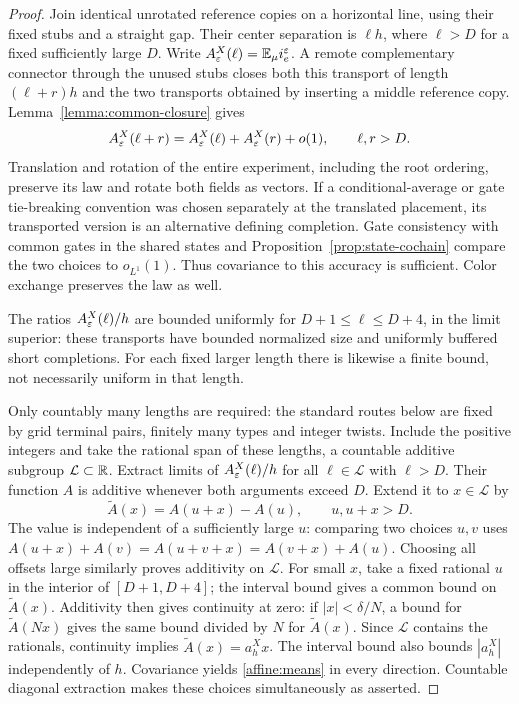 \begin{proof}
Join identical unrotated reference copies on a horizontal line, using
their fixed stubs and a straight gap.  Their center separation is
$\ell h$, where $\ell>D$ for a fixed sufficiently large $D$.  Write
$A_\varepsilon^X(\ell)=\mathbb E_\mu i_e^\varepsilon$.  A remote complementary connector
through the unused stubs closes both this transport of length
$(\ell+r)h$ and the two transports obtained by inserting a middle
reference copy.  Lemma~\ref{lemma:common-closure} gives
\[
 A_\varepsilon^X(\ell+r)=A_\varepsilon^X(\ell)+A_\varepsilon^X(r)+o(1),
       \qquad \ell,r>D.
\]
Translation and rotation of the entire experiment, including the root
ordering, preserve its law and rotate both fields as vectors.  If a
conditional-average or gate tie-breaking convention was chosen
separately at the translated placement, its transported version is an
alternative defining completion.  Gate consistency with common gates
in the shared states and Proposition~\ref{prop:state-cochain} compare
the two choices to $o_{L^1}(1)$.  Thus covariance to this accuracy is
sufficient.  Color exchange preserves the law as well.

The ratios $A_\varepsilon^X(\ell)/h$ are bounded uniformly for
$D+1\le\ell\le D+4$, in the limit superior: these transports have
bounded normalized size and uniformly buffered short completions.
For each fixed larger length there is likewise a finite bound, not
necessarily uniform in that length.

Only countably many lengths are required: the standard routes below
are fixed by grid terminal pairs, finitely many types and integer twists.
Include the positive integers and take the rational span of these
lengths, a countable additive subgroup $\mathcal L\subset\mathbb R$.  Extract
limits of $A_\varepsilon^X(\ell)/h$ for all $\ell\in\mathcal L$ with $\ell>D$.
Their function $A$ is additive whenever both arguments exceed $D$.
Extend it to $x\in\mathcal L$ by
\[
 \widetilde A(x)=A(u+x)-A(u),\qquad u,u+x>D.
\]
The value is independent of a sufficiently large $u$: comparing two
choices $u,v$ uses
$A(u+x)+A(v)=A(u+v+x)=A(v+x)+A(u)$.
Choosing all offsets large similarly proves additivity on $\mathcal L$.
For small $x$, take a fixed rational $u$ in the interior of
$[D+1,D+4]$; the interval bound gives a common bound on
$\widetilde A(x)$.  Additivity then gives continuity at zero: if
$|x|<\delta/N$, a bound for $\widetilde A(Nx)$ gives the same bound
divided by $N$ for $\widetilde A(x)$.  Since $\mathcal L$ contains the
rationals, continuity implies $\widetilde A(x)=a_h^X x$.  The interval
bound also bounds $|a_h^X|$ independently of $h$.  Covariance yields
\eqref{affine:means} in every direction.  Countable diagonal extraction
makes these choices simultaneously as asserted.
\end{proof}

